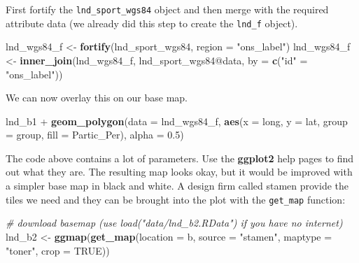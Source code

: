 \documentclass[]{article}
\newenvironment{Shaded}{}{}
\newcommand{\KeywordTok}[1]{\textcolor[rgb]{0.00,0.44,0.13}{\textbf{{#1}}}}
\newcommand{\DataTypeTok}[1]{\textcolor[rgb]{0.56,0.13,0.00}{{#1}}}
\newcommand{\FloatTok}[1]{\textcolor[rgb]{0.25,0.63,0.44}{{#1}}}
\newcommand{\StringTok}[1]{\textcolor[rgb]{0.25,0.44,0.63}{{#1}}}
\newcommand{\CommentTok}[1]{\textcolor[rgb]{0.38,0.63,0.69}{\textit{{#1}}}}
\newcommand{\OtherTok}[1]{\textcolor[rgb]{0.00,0.44,0.13}{{#1}}}
\newcommand{\NormalTok}[1]{{#1}}
\begin{document}
First fortify the \texttt{lnd\_sport\_wgs84} object and then merge with
the required attribute data (we already did this step to create the
\texttt{lnd\_f} object).

\begin{Shaded}
\begin{Highlighting}[]
\NormalTok{lnd_wgs84_f <-}\StringTok{ }\KeywordTok{fortify}\NormalTok{(lnd_sport_wgs84, }\DataTypeTok{region =} \StringTok{"ons_label"}\NormalTok{)}
\NormalTok{lnd_wgs84_f <-}\StringTok{ }\KeywordTok{inner_join}\NormalTok{(lnd_wgs84_f, lnd_sport_wgs84@data,}
  \DataTypeTok{by =} \KeywordTok{c}\NormalTok{(}\StringTok{"id"} \NormalTok{=}\StringTok{ "ons_label"}\NormalTok{))}
\end{Highlighting}
\end{Shaded}

We can now overlay this on our base map.

\begin{Shaded}
\begin{Highlighting}[]
\NormalTok{lnd_b1 +}
\StringTok{  }\KeywordTok{geom_polygon}\NormalTok{(}\DataTypeTok{data =} \NormalTok{lnd_wgs84_f,}
               \KeywordTok{aes}\NormalTok{(}\DataTypeTok{x =} \NormalTok{long, }\DataTypeTok{y =} \NormalTok{lat, }\DataTypeTok{group =} \NormalTok{group, }\DataTypeTok{fill =} \NormalTok{Partic_Per),}
               \DataTypeTok{alpha =} \FloatTok{0.5}\NormalTok{)}
\end{Highlighting}
\end{Shaded}

The code above contains a lot of parameters. Use the \textbf{ggplot2}
help pages to find out what they are. The resulting map looks okay, but
it would be improved with a simpler base map in black and white. A
design firm called stamen provide the tiles we need and they can be
brought into the plot with the \texttt{get\_map} function:

\begin{Shaded}
\begin{Highlighting}[]
\CommentTok{# download basemap (use load("data/lnd_b2.RData") if you have no internet)}
\NormalTok{lnd_b2 <-}\StringTok{ }\KeywordTok{ggmap}\NormalTok{(}\KeywordTok{get_map}\NormalTok{(}\DataTypeTok{location =} \NormalTok{b, }\DataTypeTok{source =} \StringTok{"stamen"}\NormalTok{,}
          \DataTypeTok{maptype =} \StringTok{"toner"}\NormalTok{, }\DataTypeTok{crop =} \OtherTok{TRUE}\NormalTok{))}
\end{Highlighting}
\end{Shaded}
\end{document}
